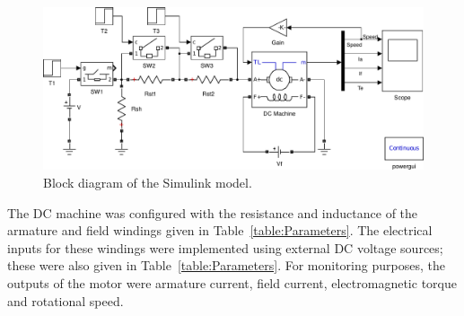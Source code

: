 \documentclass[a4paper,10pt]{article}
\begin{document}
\begin{figure}[b]
    \centering
    \includegraphics[width=\textwidth]{Model}
    \caption{Block diagram of the Simulink model.}
    \label{fig:Model}
\end{figure}

The DC machine was configured with the resistance and inductance of the 
armature and field windings given in Table~\vref{table:Parameters}. The 
electrical inputs for these windings were implemented using external DC voltage 
sources; these were also given in Table~\ref{table:Parameters}. For monitoring 
purposes, the outputs of the motor were armature current, field current,
electromagnetic torque and rotational speed.
\end{document}
